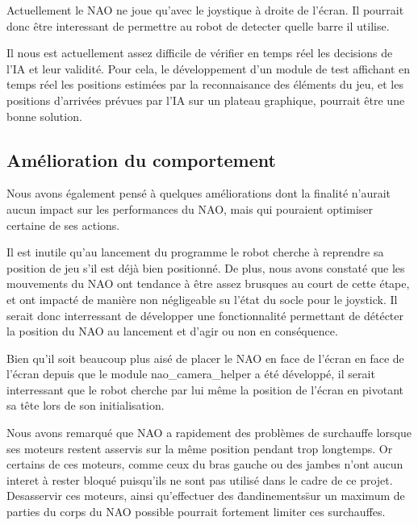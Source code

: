     \par Actuellement le NAO ne joue qu'avec le joystique à droite de l'écran.
    Il pourrait donc être interessant de permettre au robot de detecter quelle barre il utilise. \\

    \par Il nous est actuellement assez difficile de vérifier en temps réel les decisions de l'IA et leur validité.
    Pour cela, le développement d'un module de test affichant en temps réel les positions estimées par la reconnaisance des éléments du jeu, et les positions d'arrivées prévues par l'IA sur un plateau graphique, pourrait être une bonne solution.


  \subsection{Amélioration du comportement}
  \label{sub:Amélioration du comportement}
    \par Nous avons également pensé à quelques améliorations dont la finalité n'aurait aucun impact sur les performances du NAO, mais qui pouraient optimiser certaine de ses actions.\\

    \par Il est inutile qu'au lancement du programme le robot cherche à reprendre sa position de jeu s'il est déjà bien positionné.
    De plus, nous avons constaté que les mouvements du NAO ont tendance à être assez brusques au court de cette étape, et ont impacté de manière non négligeable su l'état du socle pour le joystick.
    Il serait donc interressant de développer une fonctionnalité permettant de détécter la position du NAO au lancement et d'agir ou non en conséquence.\\

    \par Bien qu'il soit beaucoup plus aisé de placer le NAO en face de l'écran en face de l'écran depuis que le module nao\_camera\_helper a été développé,
    il serait interressant que le robot cherche par lui même la position de l'écran en pivotant sa tête lors de son initialisation.\\

    \par Nous avons remarqué que NAO a rapidement des problèmes de surchauffe lorsque ses moteurs restent asservis sur la même position pendant trop longtemps.
    Or certains de ces moteurs, comme ceux du bras gauche ou des jambes n'ont aucun interet à rester bloqué puisqu'ils ne sont pas utilisé dans le cadre de ce projet.
    Desasservir ces moteurs, ainsi qu'effectuer des \"dandinements\" sur un maximum de parties du corps du NAO possible pourrait fortement limiter ces surchauffes.
\pagebreak
